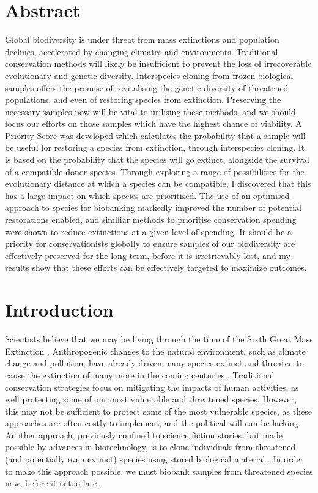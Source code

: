 \documentclass[12pt]{article}
\begin{document}
	\section{Abstract}
	Global biodiversity is under threat from mass extinctions
	and population declines, accelerated by changing climates and
	environments. Traditional conservation methods will likely be
	insufficient to prevent the loss of irrecoverable evolutionary
	and genetic diversity. Interspecies cloning from frozen
	biological samples offers the promise of revitalising the genetic
	diversity of threatened populations, and even of
	restoring species from extinction. Preserving the necessary samples
	now will be vital to utilising these methods,
	and we should focus our efforts on those samples which have
	the highest chance of viability. A Priority Score was developed
	which calculates the probability that a sample will be useful
	for restoring a species from extinction, through interspecies
	cloning. It is based
	on the probability
	that the species will go extinct, alongside the survival
	of a compatible donor species. Through exploring a range of
	possibilities for the
	evolutionary distance at which a species can be compatible,
	I discovered that this has a large impact on which species are
	prioritised.
	The use of an optimised approach to species for biobanking
	markedly improved the number of potential restorations
	enabled, and similiar methods to prioritise conservation spending
	were shown to reduce extinctions at a given level of spending. It should
	be a priority for conservationists globally to ensure samples of our
	biodiversity are effectively preserved for the long-term, before
	it is irretrievably lost, and my results show that these efforts
	can be effectively targeted to maximize outcomes.
	
	\pagebreak
	
	\section{Introduction}

	Scientists believe that we may be living through the time of the Sixth 
	Great Mass Extinction \citep{barnoskyHasEarthSixth2011}. Anthropogenic changes to the natural environment, such 
	as climate change and pollution, have already driven many species extinct and 
	threaten to cause the extinction of many more in the coming centuries \citep{ceballosVertebratesBrinkIndicators2020}. 
	Traditional conservation strategies focus on mitigating the impacts of human
	activities, as well protecting some of our most vulnerable and 
	threatened species. However, this may not be sufficient to protect some of the most
	vulnerable species, as these approaches are often costly to implement, and 
	the political will can be lacking. Another approach, previously confined to
	science fiction stories, but made possible by advances in 
	biotechnology, is to clone individuals from threatened (and potentially even
	extinct) species using stored biological material \citep{loiGeneticRescueEndangered2001,leeCanCloningEndangered2001}.
	In order to make this approach possible, we must biobank samples from threatened species now, before it is too late.
	
\end{document}
